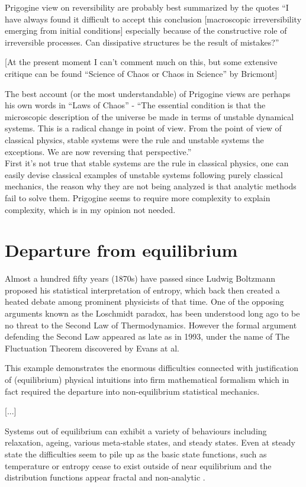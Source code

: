\documentclass[a4paper,12pt,nofootinbib]{article}
\begin{document}
Prigogine view on reversibility are probably best summarized by the quotes {``}I have always found it difficult to accept this conclusion [macroscopic
irreversibility emerging from initial conditions] { }especially because of the constructive role of irreversible processes. Can dissipative structures
be the result of mistakes?{''}

[At the present moment I can{'}t comment much on this, but some extensive critique can be found {``}Science of Chaos or Chaos in Science{''} by Bricmont]

The best account (or the most understandable) of Prigogine views are perhaps his own words in {``}Laws of Chaos{''} - {``}The essential condition
is that the microscopic description of the universe be made in terms of unstable dynamical systems. This is a radical change in point of view. From
the point of view of classical physics, stable systems were the rule and unstable systems the exceptions. We are now reversing that perspective.{''}\\
First it{'}s not true that stable systems are the rule in classical physics, one can easily devise classical examples of unstable systems following
purely classical mechanics, the reason why they are not being analyzed is that analytic methods fail to solve them. Prigogine seems to require more
complexity to explain complexity, which is in my opinion not needed.


\section{Departure from equilibrium}

Almost a hundred fifty years (1870s) have passed since Ludwig Boltzmann proposed his statistical interpretation of entropy, which back then created a heated debate among prominent physicists of that time. 
One of the opposing arguments known as the Loschmidt paradox, has been understood long ago to be no threat to the Second Law of Thermodynamics. However the formal argument defending the Second Law appeared as late as in 1993, under the name of The Fluctuation Theorem discovered by Evans at al.

This example demonstrates the enormous difficulties connected with justification of (equilibrium) physical intuitions into firm mathematical formalism which in fact required the departure into non-equilibrium statistical mechanics.

[...]

Systems out of equilibrium can exhibit a variety of behaviours including relaxation, ageing, various meta-stable states, and steady states.
Even at steady state the difficulties seem to pile up as the basic state functions, such as temperature or entropy cease to exist outside of near equilibrium and the distribution functions appear fractal and non-analytic \cite{Dewar:2014ek}.
\end{document}
